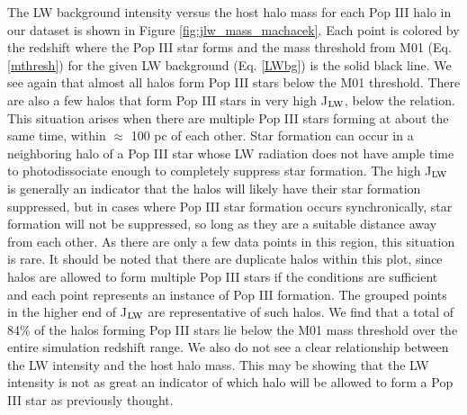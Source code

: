 \documentclass[a4paper,fleqn,usenatbib]{mnras}
\begin{document}
The LW background intensity versus the host halo mass for each Pop III halo in our dataset is shown in Figure \ref{fig:jlw_mass_machacek}. Each point is colored by the redshift where the Pop III star forms and the mass threshold from M01 (Eq. \ref{mthresh}) for the given LW background (Eq. \ref{LWbg}) is the solid black line. We see again that almost all halos form Pop III stars below the M01 threshold. There are also a few halos that form Pop III stars in very high J$_{\rm LW}$, below the relation. This situation arises when there are multiple Pop III stars forming at about the same time, within $\approx$ 100 pc of each other. Star formation can occur in a neighboring halo of a Pop III star whose LW radiation does not have ample time to photodissociate enough \hh{} to completely suppress star formation. The high J$_{\rm LW}$ is generally an indicator that the halos will likely have their star formation suppressed, but in cases where Pop III star formation occurs synchronically, star formation will not be suppressed, so long as they are a suitable distance away from each other. As there are only a few data points in this region, this situation is rare. It should be noted that there are duplicate halos within this plot, since halos are allowed to form multiple Pop III stars if the conditions are sufficient and each point represents an instance of Pop III formation. The grouped points in the higher end of J$_{\rm LW}$ are representative of such halos. We find that a total of 84\% of the halos forming Pop III stars lie below the M01 mass threshold over the entire simulation redshift range. We also do not see a clear relationship between the LW intensity and the host halo mass. This may be showing that the LW intensity is not as great an indicator of which halo will be allowed to form a Pop III star as previously thought. 
\end{document}
